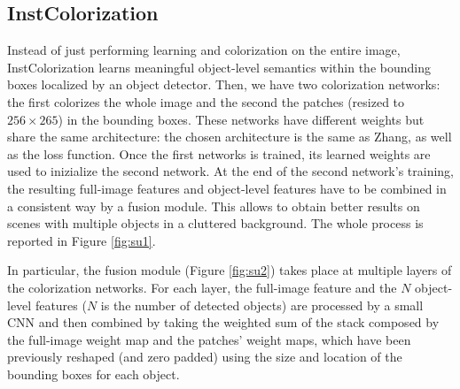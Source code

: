 \subsection{InstColorization}
Instead of just performing learning and colorization on the entire image, InstColorization learns meaningful object-level semantics within the bounding boxes localized by an object detector. Then, we have two colorization networks: the first colorizes the whole image and the second the patches (resized to $256\times265$) in the bounding boxes. These networks have different weights but share the same architecture: the chosen architecture is the same as Zhang, as well as the loss function. Once the first networks is trained, its learned weights are used to inizialize the second network. At the end of the second network's training, the resulting full-image features and object-level features have to be combined in a consistent way by a fusion module. This allows to obtain better results on scenes with multiple objects in a cluttered background. The whole process is reported in Figure \ref{fig:su1}.

In particular, the fusion module (Figure \ref{fig:su2}) takes place at multiple layers of the colorization networks. For each layer, the full-image feature and the $N$ object-level features ($N$ is the number of detected objects) are processed by a small CNN and then combined by taking the weighted sum of the stack composed by the full-image weight map and the patches' weight maps, which have been previously reshaped (and zero padded) using the size and location of the bounding boxes for each object.


